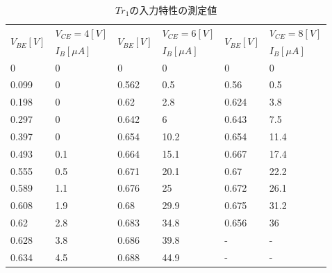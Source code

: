 \documentclass[10pt, a4j, dvipdfmx]{jarticle}
\begin{document}
    \begin{table}[H]
        \centering
        \caption{$Tr_1$の入力特性の測定値}
        \label{tbl:1}
        \small
        \begin{tabular}{|l|l|l|l|l|l|}
        \hline
        \multirow{2}{*}{$V_{BE}[V]$} & $V_{CE}=4[V]$ & \multirow{2}{*}{$V_{BE}[V]$} & $V_{CE}=6[V]$ & \multirow{2}{*}{$V_{BE}[V]$} & $V_{CE}=8[V]$ \\ \cline{2-2} \cline{4-4} \cline{6-6} 
                                & $I_B[\mu A]$   &                         & $I_B[\mu A]$   &                         & $I_B[\mu A]$   \\ \hline
        0                       & 0        & 0                       & 0        & 0                       & 0        \\ \hline
        0.099                   & 0        & 0.562                   & 0.5      & 0.56                    & 0.5      \\ \hline
        0.198                   & 0        & 0.62                    & 2.8      & 0.624                   & 3.8      \\ \hline
        0.297                   & 0        & 0.642                   & 6        & 0.643                   & 7.5      \\ \hline
        0.397                   & 0        & 0.654                   & 10.2     & 0.654                   & 11.4     \\ \hline
        0.493                   & 0.1      & 0.664                   & 15.1     & 0.667                   & 17.4     \\ \hline
        0.555                   & 0.5      & 0.671                   & 20.1     & 0.67                    & 22.2     \\ \hline
        0.589                   & 1.1      & 0.676                   & 25       & 0.672                   & 26.1     \\ \hline
        0.608                   & 1.9      & 0.68                    & 29.9     & 0.675                   & 31.2     \\ \hline
        0.62                    & 2.8      & 0.683                   & 34.8     & 0.656                   & 36       \\ \hline
        0.628                   & 3.8      & 0.686                   & 39.8     & -                       & -        \\ \hline
        0.634                   & 4.5      & 0.688                   & 44.9     & -                       & -        \\ \hline

\end{tabular}
\end{table}
\end{document}
